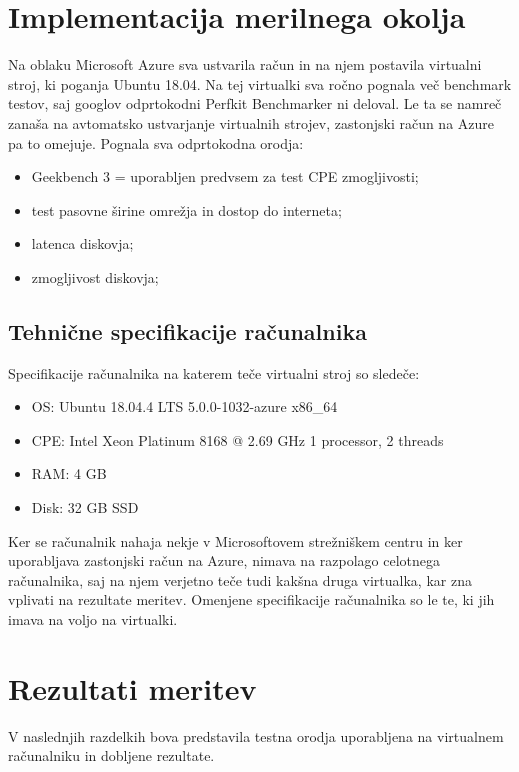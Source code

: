 \section{Implementacija merilnega okolja}
Na oblaku Microsoft Azure sva ustvarila račun in na njem postavila virtualni stroj, ki poganja Ubuntu 18.04. Na tej virtualki sva ročno pognala več benchmark testov, saj googlov odprtokodni Perfkit Benchmarker ni deloval. Le ta se namreč zanaša na avtomatsko ustvarjanje virtualnih strojev, zastonjski račun na Azure pa to omejuje. Pognala sva odprtokodna orodja:
\begin{itemize}
\item Geekbench 3 = uporabljen predvsem za test CPE zmogljivosti;
\item  test pasovne širine omrežja in dostop do interneta;
\item  latenca diskovja;
\item  zmogljivost diskovja;
\end{itemize}

\subsection{Tehnične specifikacije računalnika}
Specifikacije računalnika na katerem teče virtualni stroj so sledeče:

\begin{itemize}
\item OS: Ubuntu 18.04.4 LTS 5.0.0-1032-azure x86\_64
\item CPE: Intel Xeon Platinum 8168 @ 2.69 GHz 1 processor, 2 threads
\item RAM: 4 GB
\item Disk: 32 GB SSD
\end{itemize}
Ker se računalnik nahaja nekje v Microsoftovem strežniškem centru in ker uporabljava zastonjski račun na Azure, nimava na razpolago celotnega računalnika, saj na njem verjetno teče tudi kakšna druga virtualka, kar zna vplivati na rezultate meritev. Omenjene specifikacije računalnika so le te, ki jih imava na voljo na virtualki.


\section{Rezultati meritev}

V naslednjih razdelkih bova predstavila testna orodja uporabljena na virtualnem računalniku in dobljene rezultate.

